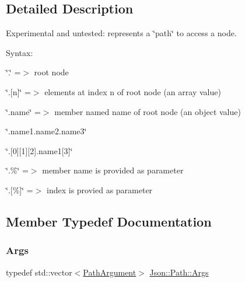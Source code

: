 \subsection{Detailed Description}
Experimental and untested\+: represents a \char`\"{}path\char`\"{} to access a node. 

Syntax\+:
\begin{DoxyItemize}
\item \char`\"{}.\char`\"{} =$>$ root node
\item \char`\"{}.\mbox{[}n\mbox{]}\char`\"{} =$>$ elements at index \textquotesingle{}n\textquotesingle{} of root node (an array value)
\item \char`\"{}.\+name\char`\"{} =$>$ member named \textquotesingle{}name\textquotesingle{} of root node (an object value)
\item \char`\"{}.\+name1.\+name2.\+name3\char`\"{}
\item \char`\"{}.\mbox{[}0\mbox{]}\mbox{[}1\mbox{]}\mbox{[}2\mbox{]}.\+name1\mbox{[}3\mbox{]}\char`\"{}
\item \char`\"{}.\%\char`\"{} =$>$ member name is provided as parameter
\item \char`\"{}.\mbox{[}\%\mbox{]}\char`\"{} =$>$ index is provied as parameter 
\end{DoxyItemize}

\subsection{Member Typedef Documentation}
\mbox{\label{classJson_1_1Path_a27d96232d034d7a78286468676f9cb3e_a27d96232d034d7a78286468676f9cb3e}} 
\subsubsection{\texorpdfstring{Args}{Args}}
{\footnotesize\ttfamily typedef std\+::vector$<$\hyperlink{classJson_1_1PathArgument}{Path\+Argument}$>$ \hyperlink{classJson_1_1Path_a27d96232d034d7a78286468676f9cb3e_a27d96232d034d7a78286468676f9cb3e}{Json\+::\+Path\+::\+Args}\hspace{0.3cm}{\ttfamily [private]}}

\mbox{\label{classJson_1_1Path_ab29d7b2fc896c7d3c5ed4609af3a3f23_ab29d7b2fc896c7d3c5ed4609af3a3f23}} 
